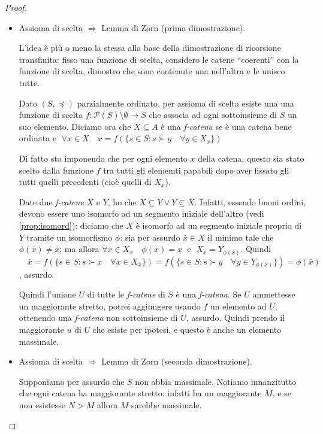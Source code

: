 \documentclass[a4paper,10pt,oneside]{article}
\newcommand{\myname}[1]{\emph{#1}}
\theoremstyle{plain}
\theoremstyle{definition}
\theoremstyle{remark}
\begin{document}
\begin{proof}\
\begin{itemize}
 \item Assioma di scelta $\Rightarrow$ Lemma di Zorn (prima dimostrazione).
 
 L'idea è più o meno la stessa alla base della dimostrazione di ricorsione transfinita: fisso una funzione di scelta, considero le catene ``coerenti'' con la funzione di scelta, dimostro che sono contenute una nell'altra e le unisco tutte.
 
 Dato $(S,\preceq)$ parzialmente ordinato, per assioma di scelta esiste una una funzione di scelta $f: \mathcal P (S)\setminus{\emptyset} \rightarrow S$ che associa ad ogni sottoinsieme di $S$ un suo elemento. Diciamo ora che $X\subseteq A$ è una \myname{f-catena} se è una catena bene ordinata e $\; \forall x\in X \quad x=f(\{s\in S: s\succ y \quad \forall y\in X_x\})$
 
 Di fatto sto imponendo che per ogni elemento $x$ della catena, questo sia stato scelto dalla funzione $f$ tra tutti gli elememti papabili dopo aver fissato gli tutti quelli precedenti (cioè quelli di $X_x$).
 
 Date due \myname{f-catene} $X$ e $Y$, ho che $X\subseteq Y \vee Y\subseteq X$. Infatti, essendo buoni ordini, devono essere uno isomorfo ad un segmento iniziale dell'altro (vedi \ref{prop:isomord}): diciamo che $X$ è isomorfo ad un segmento iniziale proprio di $Y$ tramite un isomorfismo $\phi$: sia per assurdo $\bar x\in X$ il minimo tale che $\phi(\bar x)\not = \bar x$; ma allora $\forall x\in X_{\bar x} \quad \phi(x)=x \;$ e $\; X_{\bar x}=Y_{\phi(\bar x)}$. Quindi $\quad\bar x=f(\{s\in S:s\succ x \quad \forall x\in X_{\bar x}\})=f(\{s\in S:s\succ y \quad \forall y\in Y_{\phi(\bar x)}\})=\phi(\bar x)$, assurdo.
 
 Quindi l'unione $U$ di tutte le \myname{f-catene} di $S$ è una \myname{f-catena}. Se $U$ ammettesse un maggiorante stretto, potrei aggiungere usando $f$ un elemento ad $U$, ottenendo una \myname{f-catena} non sottoinsieme di $U$, assurdo. Quindi prendo il maggiorante $u$ di $U$ che esiste per ipotesi, e questo è anche un elemento massimale.
 
 \item Assioma di scelta $\Rightarrow$ Lemma di Zorn (seconda dimostrazione).
 
 Supponiamo per assurdo che $S$ non abbia massimale. Notiamo innanzitutto che ogni catena ha maggiorante stretto: infatti ha un maggiorante $M$, e se non esistesse $N>M$ allora $M$ sarebbe massimale.
	

\end{itemize}
\end{proof}
\end{document}
